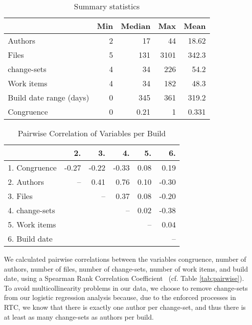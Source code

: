 \begin{table}[t]
\centering
\caption{Summary statistics}
\label{tab:pairwise}
\begin{tabular}{lrrrr}
\toprule
 & Min & Median & Max & Mean\\\midrule
Authors & 2 & 17 & 44 & 18.62\\
Files & 5 & 131 & 3101 & 342.3 \\
change-sets & 4  & 34  & 226 & 54.2\\
Work items & 4 & 34  & 182 & 48.3 \\
Build date range (days) & 0  & 345  & 361 & 319.2 \\
Congruence & 0  & 0.21  & 1 & 0.331 \\
\bottomrule
\end{tabular}
\label{tab:summary}
\end{table}

\begin{table}[t]
\begin{center}
\caption{Pairwise Correlation of Variables per Build}
\begin{tabular}{lrrrrr}
\toprule
 & 2. & 3. & 4. & 5. & 6. \\ 
  \midrule
   1. Congruence  & -0.27 & -0.22 & -0.33 & 0.08 & 0.19 \\ 
   2. Authors & --& 0.41 & 0.76 & 0.10 & -0.30 \\ 
   3. Files &  & --& 0.37 & 0.08 & -0.20 \\ 
   4. change-sets &  &  &  --& 0.02 & -0.38 \\ 
   5. Work items  &  &  &  &  --& 0.04 \\ 
   6. Build date &  &  &  &  & -- \\ 
\bottomrule
\end{tabular}
\end{center}
\end{table}

We calculated pairwise correlations between the variables congruence, number of authors, number of files, number of change-sets, number of work items, and build date, using a Spearman Rank Correlation Coefficient~\cite{Sheskin2000} (cf. Table \ref{tab:pairwise}). To avoid multicollinearity problems in our data, we choose to remove change-sets from our logistic regression analysis because, due to the enforced processes in RTC, we know that there is exactly one author per change-set, and thus there is at least as many change-sets as authors per build.

